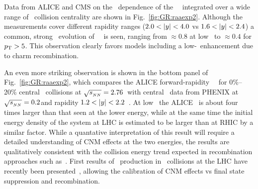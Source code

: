 Data from ALICE and CMS on the \pT\ dependence of the \jpsi\ \Raa\ integrated over a wide range of \PbPb\ collision centrality
are shown in Fig.~\ref{fig:GR:raaexp2}. Although the measurements 
cover different rapidity ranges ($2.0 < |y| < 4.0$ vs $ 1.6  < |y| < 2.4 $)
a common, strong \pT\ evolution of \jpsi\ \Raa\ is seen, ranging from $\approx 0.8$ at low \pT\ to $\approx 0.4$ for $\mbox{$p_{\mathrm{T}}$} > 5$\GeVc.
This observation clearly favors models including a low-\pT\ enhancement due to charm recombination.

An even more striking observation is shown in the bottom panel of Fig.~\ref{fig:GR:raaexp2}, which compares 
the ALICE forward-rapidity \jpsi\ \Raa\ for 0\%--20\% central \PbPb\ collisions at  $\sqrt{s_{_{NN}}} = 2.76$\TeV\
with central \AuAu\ data from PHENIX at $\sqrt{s_{_{NN}}} = 0.2$\GeV and rapidity $1.2 < |y| < 2.2$~\cite{Adare:2011yf}.
At low \pT\ the ALICE \Raa\ is about four times larger than that seen at the lower energy, while 
at the same time the initial energy density of the system at LHC is estimated to be larger than at 
RHIC by a similar factor. While a quantative interpretation of this result will require 
a detailed understanding of CNM effects at the two energies, the results are qualitatively consistent 
with the collision energy trend expected in recombination approaches such as~\cite{Zhao:2007hh,Zhou:2013aea,Liu:2009nb}.
First results of \jpsi\ production in \pPb\ collisions at the LHC have recently 
been presented~\cite{Abelev:2013yxa,Aaij:2013zxa}, allowing
the calibration of CNM effects vs final state suppression and recombination.

